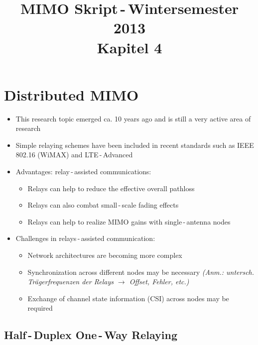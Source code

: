 \documentclass[a4paper, 10pt]{article}
\title{MIMO Skript\,-\,Wintersemester 2013 \\ Kapitel 4}
\date{}
\begin{document}
\maketitle
\tableofcontents
\setcounter{section}{3}
\section{Distributed MIMO}

\begin{itemize}
	\item This research topic emerged ca. 10 years ago and is still a very active area of research
	\item Simple relaying schemes have been included in recent standards such as IEEE 802.16 (WiMAX) and LTE\,-\,Advanced
	\item Advantages: relay\,-\,assisted communications:
	\begin{itemize}
		\item Relays can help to reduce the effective overall pathloss
		\item Relays can also combat small\,-\,scale fading effects
		\item Relays can help to realize MIMO gains with single\,-\,antenna nodes
	\end{itemize}
	\item Challenges in relays\,-\,assisted communication:
	\begin{itemize}
		\item Network architectures are becoming more complex
		\item Synchronization across different nodes may be necessary \textit{(Anm.: untersch. Tr\"agerfrequenzen der Relays $\rightarrow $ Offset, Fehler, etc.)}
		\item Exchange of channel state information (CSI) across nodes may be required
	\end{itemize}
\end{itemize}

\subsection{Half\,-\,Duplex One\,-\,Way Relaying}
\end{document}
